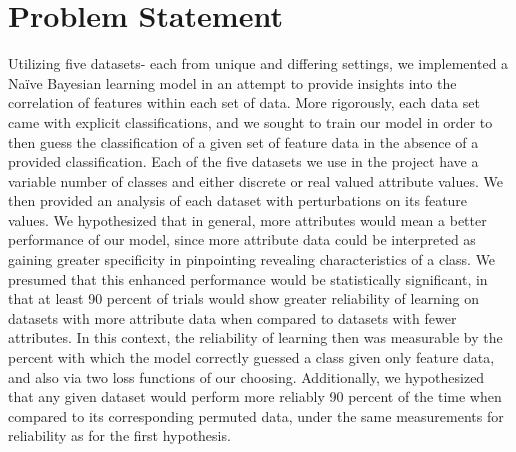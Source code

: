 \documentclass[twoside,11pt]{article}
\begin{document}
\section{Problem Statement}
Utilizing five datasets- each from unique and differing settings, we implemented a
 Na{\"i}ve Bayesian learning model in an attempt to provide insights into the correlation 
 of features within each set of data. More rigorously, each data set came with explicit classifications,
  and we sought to train our model in order to then guess the classification of a given set of feature data
  in the absence of a provided classification. Each of the five datasets we use in the project have a variable 
  number of classes and either discrete or real valued attribute values. We then provided an analysis of each
  dataset with perturbations on its feature values. We hypothesized that in general, more attributes would mean
  a better performance of our model, since more attribute data could be interpreted as gaining greater specificity in
  pinpointing revealing characteristics of a class. We presumed that this enhanced performance would be statistically
  significant, in that at least 90 percent of trials would show greater reliability of learning on datasets with more attribute data 
  when compared to datasets with fewer attributes. In this context, the reliability of learning then was measurable by the percent with which the
  model correctly guessed a class given only feature data, and also via two loss functions of our choosing. Additionally, we
  hypothesized that any given dataset would perform more reliably 90 percent of the time when compared to its corresponding permuted
  data, under the same measurements for reliability as for the first hypothesis. 
\end{document}

